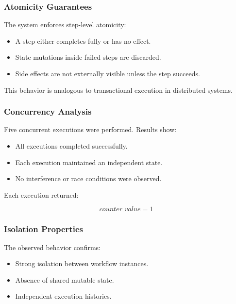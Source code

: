 \subsubsection{Atomicity Guarantees}

The system enforces step-level atomicity:

\begin{itemize}
    \item A step either completes fully or has no effect.
    \item State mutations inside failed steps are discarded.
    \item Side effects are not externally visible unless the step succeeds.
\end{itemize}

This behavior is analogous to transactional execution in distributed systems.

\subsubsection{Concurrency Analysis}

Five concurrent executions were performed. Results show:

\begin{itemize}
    \item All executions completed successfully.
    \item Each execution maintained an independent state.
    \item No interference or race conditions were observed.
\end{itemize}

Each execution returned:

\begin{equation}
counter\_value = 1
\end{equation}

\subsubsection{Isolation Properties}

The observed behavior confirms:

\begin{itemize}
    \item Strong isolation between workflow instances.
    \item Absence of shared mutable state.
    \item Independent execution histories.
\end{itemize}

